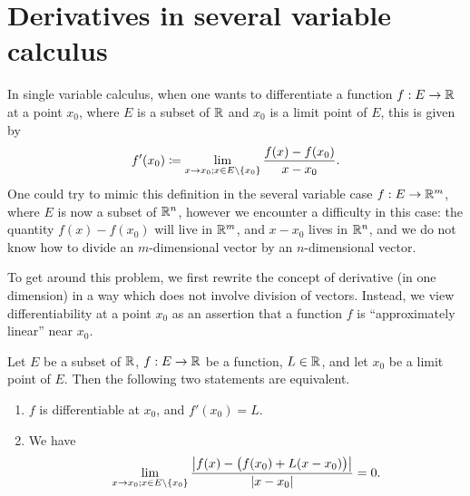 \section{Derivatives in several variable calculus}\label{ii:sec:6.2}

\begin{note}
  In single variable calculus, when one wants to differentiate a function \(f : E \to \mathbb{R}\) at a point \(x_0\), where \(E\) is a subset of \(\mathbb{R}\) and \(x_0\) is a limit point of \(E\), this is given by
  \[
    f'(x_0) \coloneqq \lim_{x \to x_0 ; x \in E \setminus \left\lbrace x_0\right\rbrace} \dfrac{f(x) - f(x_0)}{x - x_0}.
  \]
  One could try to mimic this definition in the several variable case \(f : E \to \mathbb{R}^m\), where \(E\) is now a subset of \(\mathbb{R}^n\), however we encounter a difficulty in this case:
  the quantity \(f(x) - f(x_0)\) will live in \(\mathbb{R}^m\), and \(x - x_0\) lives in \(\mathbb{R}^n\), and we do not know how to divide an \(m\)-dimensional vector by an \(n\)-dimensional vector.

  To get around this problem, we first rewrite the concept of derivative (in one dimension) in a way which does not involve division of vectors.
  Instead, we view differentiability at a point \(x_0\) as an assertion that a function \(f\) is ``approximately linear'' near \(x_0\).
\end{note}

\begin{lem}\label{ii:6.2.1}
  Let \(E\) be a subset of \(\mathbb{R}\), \(f : E \to \mathbb{R}\) be a function, \(L \in \mathbb{R}\), and let \(x_0\) be a limit point of \(E\).
  Then the following two statements are equivalent.
  \begin{enumerate}
    \item \(f\) is differentiable at \(x_0\), and \(f'(x_0) = L\).
    \item We have
          \[
            \lim_{x \to x_0 ; x \in E \setminus \left\lbrace x_0\right\rbrace} \dfrac{\left\lvert f(x) - \big(f(x_0) + L (x - x_0)\big)\right\rvert}{\left\lvert x - x_0\right\rvert} = 0.
          \]
  \end{enumerate}
\end{lem}

